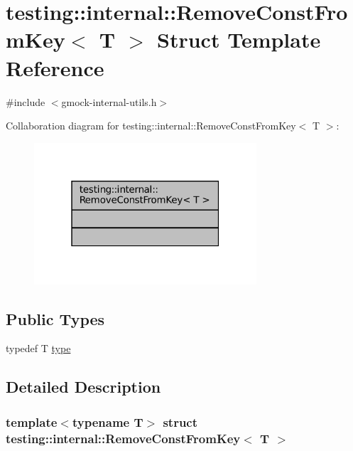 \hypertarget{structtesting_1_1internal_1_1RemoveConstFromKey}{}\section{testing\+:\+:internal\+:\+:Remove\+Const\+From\+Key$<$ T $>$ Struct Template Reference}
\label{structtesting_1_1internal_1_1RemoveConstFromKey}


{\ttfamily \#include $<$gmock-\/internal-\/utils.\+h$>$}



Collaboration diagram for testing\+:\+:internal\+:\+:Remove\+Const\+From\+Key$<$ T $>$\+:
\nopagebreak
\begin{figure}[H]
\begin{center}
\leavevmode
\includegraphics[width=235pt]{structtesting_1_1internal_1_1RemoveConstFromKey__coll__graph}
\end{center}
\end{figure}
\subsection*{Public Types}
\begin{DoxyCompactItemize}
\item 
typedef T \hyperlink{structtesting_1_1internal_1_1RemoveConstFromKey_ab657b0a0fe4ebc499d27011f73c794c1}{type}
\end{DoxyCompactItemize}


\subsection{Detailed Description}
\subsubsection*{template$<$typename T$>$\newline
struct testing\+::internal\+::\+Remove\+Const\+From\+Key$<$ T $>$}



